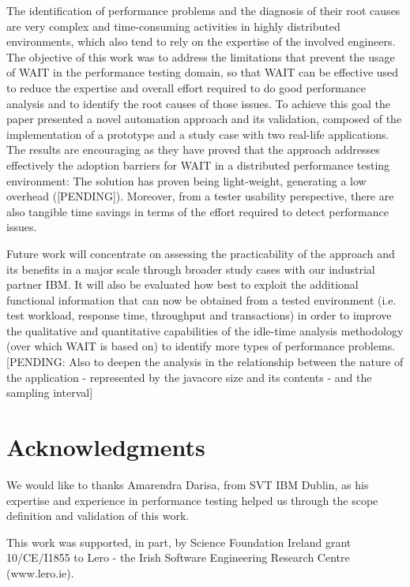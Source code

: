 \documentclass[runningheads,a4paper]{llncs}
\begin{document}
The identification of performance problems and the diagnosis of their root
causes are very complex and time-consuming activities in highly distributed
environments, which also tend to rely on the expertise of the involved
engineers. The objective of this work was to address the limitations that
prevent the usage of WAIT in the performance testing domain, so that WAIT can be
effective used to reduce the expertise and overall effort required to do
good performance analysis and to identify the root causes of those issues.
To achieve this goal the paper presented a novel automation approach and its
validation, composed of the implementation of a prototype and a study
case with two real-life applications. The results are encouraging as they have
proved that the approach addresses effectively the adoption barriers for WAIT in 
a distributed performance testing environment: The solution has proven being
light-weight, generating a low overhead ([PENDING]). Moreover, from a tester
usability perspective, there are also tangible time savings in terms of the
effort required to detect performance issues.

Future work will concentrate on assessing the practicability of the
approach and its benefits in a major scale through broader study cases with our
industrial partner IBM. It will also be evaluated how best to exploit the
additional functional information that can now be obtained from a tested environment
(i.e. test workload, response time, throughput and transactions) in order to
improve the qualitative and quantitative capabilities of the idle-time
analysis methodology (over which WAIT is based on) to identify more
types of performance problems.
[PENDING: Also to deepen the analysis in the relationship between the nature of
the application - represented by the javacore size and its contents - and the
sampling interval]


\section*{Acknowledgments}

We would like to thanks Amarendra Darisa, from SVT IBM Dublin, as his expertise
and experience in performance testing helped us through the scope definition and validation of this work.

This work was supported, in part, by Science Foundation Ireland grant 10/CE/I1855 to Lero - the Irish Software Engineering Research Centre (www.lero.ie).




\end{document}
